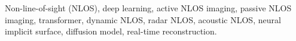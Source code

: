 \documentclass[journal]{IEEEtran}
\begin{document}
% 
%



% 











\maketitle

\begin{IEEEkeywords}
Non-line-of-sight (NLOS), deep learning, active NLOS imaging, passive NLOS imaging, transformer, dynamic NLOS, radar NLOS, acoustic NLOS, neural implicit surface, diffusion model, real-time reconstruction.
\end{IEEEkeywords}
\end{document}
